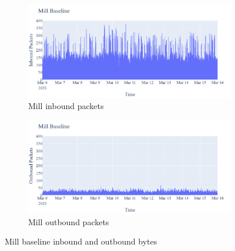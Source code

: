 \begin{figure}[H]
    \begin{subfigure}[b]{0.4\textwidth}
        \includegraphics[width=\textwidth]{figures/Mill_Baseline_InboundPackets.png}
        \caption{Mill inbound packets}
    \end{subfigure}
    \begin{subfigure}[b]{0.4\textwidth}
        \includegraphics[width=\textwidth]{figures/Mill_Baseline_OutboundPackets.png}
        \caption{Mill outbound packets}
    \end{subfigure}
    \caption{Mill baseline inbound and outbound bytes}
    \label{Fig:MillBaselineOutandInboundTraffic}
 \end{figure}

